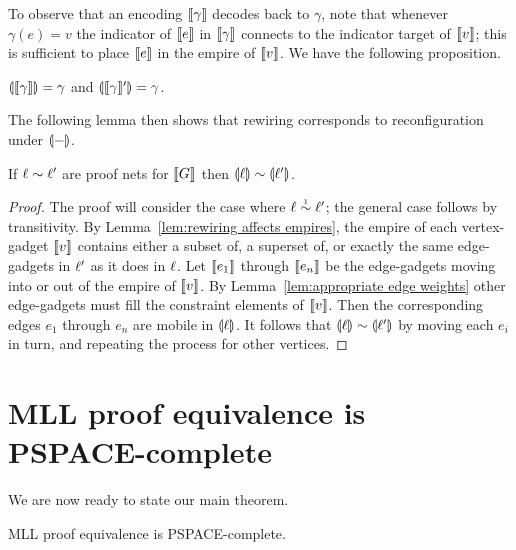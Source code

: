 \documentclass{lmcs}
\let\capsabbrev=\uppercase
\begin{document}
To observe that an encoding $\llbracket\gamma\rrbracket$ decodes back to $\gamma$, note that whenever $\gamma(e)=v$ the indicator of $\llbracket e\rrbracket$ in $\llbracket\gamma\rrbracket$ connects to the indicator target of $\llbracket v\rrbracket$; this is sufficient to place $\llbracket e\rrbracket$ in the empire of $\llbracket v\rrbracket$. We have the following proposition.

\begin{proposition}
\label{prop:retraction}
$\llparenthesis\llbracket\gamma\rrbracket\rrparenthesis=\gamma$ and $\llparenthesis\llbracket\gamma\rrbracket'\rrparenthesis=\gamma$.
\end{proposition}


The following lemma then shows that rewiring corresponds to reconfiguration under $\llparenthesis-\rrparenthesis$.


\begin{lemma}
\label{lem:soundness}
If $\links\perm\links'$ are proof nets for $\llbracket G\rrbracket$ then $\coitn\links\perm\coitn{\links'}$.
\end{lemma}

\begin{proof}
The proof will consider the case where $\links\perm*\links'$; the general case follows by transitivity.
%
By Lemma~\ref{lem:rewiring affects empires}, the empire of each vertex-gadget $\llbracket v\rrbracket$ contains either a subset of, a superset of, or exactly the same edge-gadgets in $\ell'$ as it does in $\ell$.
%
Let $\llbracket e_1\rrbracket$ through $\llbracket e_n\rrbracket$ be the edge-gadgets moving into or out of the empire of $\llbracket v\rrbracket$.
%
By Lemma~\ref{lem:appropriate edge weights} other edge-gadgets must fill the constraint elements of $\llbracket v\rrbracket$.
%
Then the corresponding edges $e_1$ through $e_n$ are mobile in $\llparenthesis\ell\rrparenthesis$.
%
It follows that $\coitn\links\perm\coitn{\links'}$ by moving each $e_i$ in turn, and repeating the process for other vertices.
%
\end{proof}





\section{\capsabbrev{mll} proof equivalence is \capsabbrev{pspace}-complete}


%
We are now ready to state our main theorem.


\begin{theorem}
\capsabbrev{mll} proof equivalence is \capsabbrev{pspace}-complete.
\end{theorem}
\end{document}
